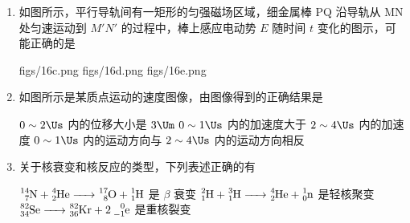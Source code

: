 \documentclass[\gkver]{gaokaozhenti}
\begin{document}
\begin{enumerate}
{体积变小，压强变大}
{体积不变，压强变大}
{体积变小，压强变小}


\item
如图所示，平行导轨间有一矩形的匀强磁场区域，细金属棒 PQ 沿导轨从 MN 处匀速运动到 $M'N'$ 的过程中，棒上感应电动势 $E$ 随时间 $t$ 变化的图示，可能正确的是


{figs/16c.png}
{figs/16d.png}
{figs/16e.png}


\item
如图所示是某质点运动的速度图像，由图像得到的正确结果是


{$0\sim2\Us$ 内的位移大小是 $3\Um$}
{$0\sim1\Us$ 内的加速度大于 $2\sim4\Us$ 内的加速度}
{$0\sim1\Us$ 内的运动方向与 $2\sim4\Us$ 内的运动方向相反}


\item
关于核衰变和核反应的类型，下列表述正确的有

{$\ce{^{14}_{7}N + ^{4}_{2}He -> ^{17}_{8}O + ^{1}_{1}H}$ 是 $\beta$ 衰变}
{$\ce{^{2}_{1}H + ^{3}_{1}H -> ^{4}_{2}He + ^{1}_{0}n}$ 是轻核聚变}
{$\ce{^{82}_{34}Se -> ^{82}_{36}Kr + 2^{0}_{-1}e}$ 是重核裂变}


\end{enumerate}
\end{document}
